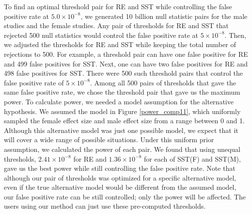 \documentclass[11pt]{article}
\begin{document}
To find an optimal threshold pair for RE and SST while controlling the false positive rate at
$5.0 \times 10^{-8}$, 
we generated 10 billion null statistic pairs for the male studies and the female studies. 
Any pair of thresholds for RE and SST that rejected 500 null statistics 
would control the false positive rate 
at  $5 \times 10^{-8}$. 
Then, we adjusted the thresholds for RE and SST while keeping the total number of rejections to 500.
For example, a threshold pair can have one false positive for RE and 499 false positives 
for SST. Next, one can have two false positives for RE and 498 false positives for SST. 
There were 500 such threshold pairs that control the false positive rate of $5 \times 10^{-8}$. 
Among all 500 pairs of thresholds that gave the same false positive rate, we 
chose the threshold pair that gave us the maximum power.
To calculate power, we needed a model assumption for the alternative hypothesis. 
We assumed the model in Figure \ref{power_comp11}, which uniformly sampled the female effect size
and male effect size from a range between 0 and 1.
Although this alternative model was just one possible model, we expect that it will cover a wide range
of possible situations.
Under this uniform prior assumption, we calculated the power of each pair.
We found that using unequal thresholds, 
$2.41 \times 10^{-8}$ for RE and $1.36 \times 10^{-8}$ for each of SST(F) and SST(M), gave us the best power
while still controlling the false positive rate.
Note that although our pair of thresholds was optimized for a specific alternative model,
even if the true alternative model would be different from the assumed model, 
our false positive rate can be still controlled; only the power will be affected.
The users using our method can just use these pre-computed thresholds.
\end{document}
